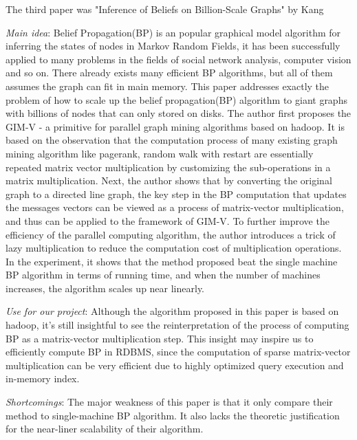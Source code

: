 The third paper was "Inference of Beliefs on Billion-Scale Graphs" by Kang
\cite{kang2010inference}
\begin{itemize*}
\item {\em Main idea}:  
		Belief Propagation(BP) is an popular graphical model algorithm for inferring the states of nodes in Markov Random Fields, it has been successfully applied to many problems in the fields of social network analysis, computer vision and so on. There already exists many efficient BP algorithms, but all of them assumes the graph can fit in main memory. This paper addresses exactly the problem of how to scale up the belief propagation(BP) algorithm to giant graphs with billions of nodes that can only stored on disks. The author first proposes the GIM-V - a primitive for parallel graph mining algorithms based on hadoop. It is based on the observation that the computation process of many existing graph mining algorithm like pagerank, random walk with restart are essentially repeated matrix vector multiplication by customizing the sub-operations in a matrix multiplication. Next, the author shows that by converting the original graph to a directed line graph, the key step in the BP computation that updates the messages vectors can be viewed as a process of matrix-vector multiplication, and thus can be applied to the framework of GIM-V. To further improve the efficiency of the parallel computing algorithm, the author introduces a trick of lazy multiplication to reduce the computation cost of multiplication operations. In the experiment, it shows that the method proposed beat the single machine BP algorithm in terms of running time, and when the number of machines increases, the algorithm scales up near linearly.

\item {\em Use for our project}:
       Although the algorithm proposed in this paper is based on hadoop, it's still insightful to see the reinterpretation of the process of computing BP as a matrix-vector multiplication step. This insight may inspire us to efficiently compute BP in RDBMS, since the computation of sparse matrix-vector multiplication can be very efficient due to highly optimized query execution and in-memory index.
\item {\em Shortcomings}:
		The major weakness of this paper is that it only compare their method to single-machine BP algorithm. It also lacks the theoretic justification for the near-liner scalability of their algorithm.
\end{itemize*}
